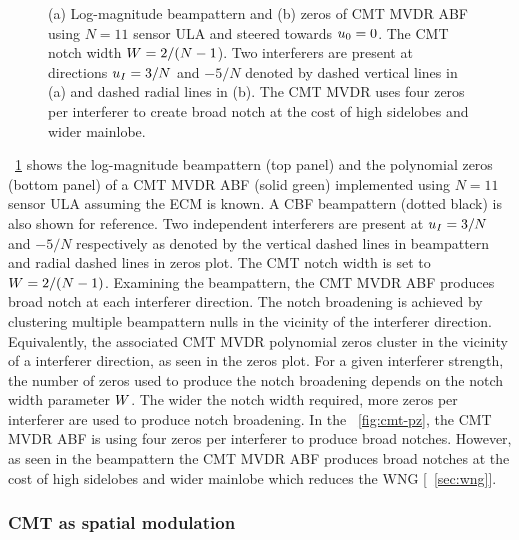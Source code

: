 \begin{figure}[!ht]
  \centering


  \caption{(a) Log-magnitude beampattern and (b) zeros of CMT MVDR ABF using $N = 11$ sensor ULA and steered towards $u_0 = 0$. The CMT notch width $W = 2/(N-1$). Two interferers are present at directions $u_I = 3/N$ and $-5/N$ denoted by dashed vertical lines in (a) and dashed radial lines in (b). The CMT MVDR uses four zeros per interferer to create broad notch at the cost of high sidelobes and wider mainlobe.}
\label{fig:cmt-bp-pz}
\end{figure}

\figurename{}~\ref{fig:cmt-bp-pz} shows the log-magnitude beampattern
(top panel) and the polynomial zeros (bottom panel) of a CMT MVDR ABF
(solid green) implemented using $N = 11$ sensor ULA assuming the ECM
is known. A CBF beampattern (dotted black) is also shown for
reference. Two independent interferers are present at $u_I = 3/N$
and $-5/N$ respectively as denoted by the vertical dashed lines in
beampattern and radial dashed lines in zeros plot. The CMT notch width
is set to $W = 2/(N-1)$. Examining the beampattern, the CMT MVDR
ABF produces broad notch at each interferer direction. The notch
broadening is achieved by clustering multiple beampattern nulls in the
vicinity of the interferer direction. Equivalently, the associated CMT
MVDR polynomial zeros cluster in the vicinity of a interferer
direction, as seen in the zeros plot. For a given interferer strength,
the number of zeros used to produce the notch broadening depends on
the notch width parameter $W$. The wider the notch width
required, more zeros per interferer are used to produce notch
broadening. In the \figurename{}~\ref{fig:cmt-pz}, the CMT MVDR ABF is
using four zeros per interferer to produce broad notches. However, as
seen in the beampattern the CMT MVDR ABF produces broad notches at the
cost of high sidelobes and wider mainlobe which reduces the WNG
[\sect{}~\ref{sec:wng}].

\subsubsection{CMT as spatial modulation}
\label{sec:cmt-as-spatial}


